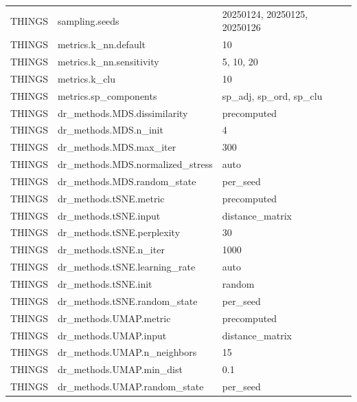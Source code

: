 \begin{table}[h]
\begin{tabular}{lll}
THINGS & sampling.seeds & 20250124, 20250125, 20250126 \\
THINGS & metrics.k\_nn.default & 10 \\
THINGS & metrics.k\_nn.sensitivity & 5, 10, 20 \\
THINGS & metrics.k\_clu & 10 \\
THINGS & metrics.sp\_components & sp\_adj, sp\_ord, sp\_clu \\
THINGS & dr\_methods.MDS.dissimilarity & precomputed \\
THINGS & dr\_methods.MDS.n\_init & 4 \\
THINGS & dr\_methods.MDS.max\_iter & 300 \\
THINGS & dr\_methods.MDS.normalized\_stress & auto \\
THINGS & dr\_methods.MDS.random\_state & per\_seed \\
THINGS & dr\_methods.tSNE.metric & precomputed \\
THINGS & dr\_methods.tSNE.input & distance\_matrix \\
THINGS & dr\_methods.tSNE.perplexity & 30 \\
THINGS & dr\_methods.tSNE.n\_iter & 1000 \\
THINGS & dr\_methods.tSNE.learning\_rate & auto \\
THINGS & dr\_methods.tSNE.init & random \\
THINGS & dr\_methods.tSNE.random\_state & per\_seed \\
THINGS & dr\_methods.UMAP.metric & precomputed \\
THINGS & dr\_methods.UMAP.input & distance\_matrix \\
THINGS & dr\_methods.UMAP.n\_neighbors & 15 \\
THINGS & dr\_methods.UMAP.min\_dist & 0.1 \\
THINGS & dr\_methods.UMAP.random\_state & per\_seed \\
\bottomrule
\end{tabular}
\end{table}